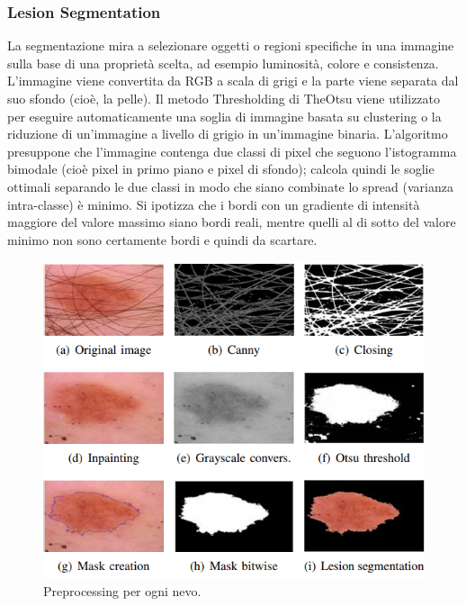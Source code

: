 {\subsubsection{Lesion Segmentation}
La segmentazione mira a selezionare oggetti o regioni specifiche in una immagine sulla base di una proprietà scelta, ad esempio luminosità, colore e consistenza.
L'immagine viene convertita da RGB a scala di grigi e la parte viene separata dal suo sfondo (cioè, la pelle).
Il metodo Thresholding di TheOtsu viene utilizzato per eseguire automaticamente una soglia di immagine basata su clustering o la riduzione di un'immagine a livello di grigio in un'immagine binaria. L'algoritmo presuppone che l'immagine contenga due classi di pixel che seguono l'istogramma bimodale (cioè pixel in primo piano e pixel di sfondo); calcola quindi le soglie ottimali separando le due classi in modo che siano combinate lo spread (varianza intra-classe) è minimo. Si ipotizza che i bordi con un gradiente di intensità maggiore del valore massimo siano bordi reali, mentre quelli al di sotto del valore minimo non sono certamente bordi e quindi da scartare. 
\begin{figure}[h]
	\begin{center}
		\includegraphics[scale=0.68]{figure/capitolo3/imagepro.png}
	\end{center}
	\caption{Preprocessing per ogni nevo.}	
\end{figure}
\newpage
}
